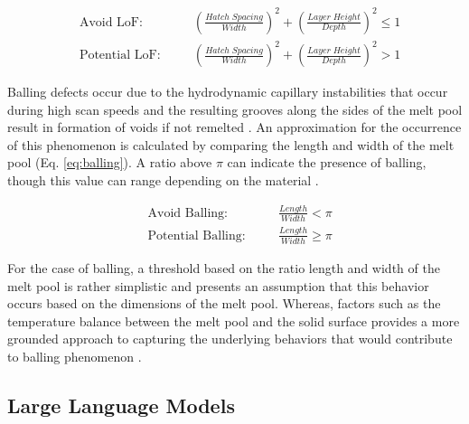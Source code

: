 \begin{subequations}
\label{eq:lof}
\begin{alignat}{2}
  &\text{Avoid LoF:} \quad && \left(\frac{Hatch\;Spacing}{Width}\right)^2 + \left(\frac{Layer\;Height}{Depth}\right)^2 \le 1 \label{eq:avoid_lack_of_fusion}\\
  &\text{Potential LoF:}    \quad && \left(\frac{Hatch\;Spacing}{Width}\right)^2 + \left(\frac{Layer\;Height}{Depth}\right)^2 > 1 \label{eq:potential_lack_of_fusion} 
\end{alignat}
\end{subequations}

Balling defects occur due to the hydrodynamic capillary instabilities that occur
during high scan speeds and the resulting grooves along the sides of the melt
pool result in formation of voids if not remelted \cite{gu_balling_2007}. An
approximation for the occurrence of this phenomenon is calculated by comparing
the length and width of the melt pool (Eq. \ref{eq:balling}). A ratio above
$\pi$ can indicate the presence of balling, though this value can range
depending on the material \cite{zhang_efficient_2021}.

\begin{subequations}
\label{eq:balling}
\begin{alignat}{2}
  &\text{Avoid Balling:}      \quad && \frac{Length}{Width} < \pi   \label{eq:avoid_balling}\\
  &\text{Potential Balling:}  \quad && \frac{Length}{Width} \ge \pi \label{eq:potential_balling}
\end{alignat}
\end{subequations}

For the case of balling, a threshold based on the ratio length and width of the
melt pool is rather simplistic and presents an assumption that this behavior
occurs based on the dimensions of the melt pool. Whereas, factors such as the
temperature balance between the melt pool and the solid surface provides a more
grounded approach to capturing the underlying behaviors that would contribute to
balling phenomenon \cite{lindstrom_simple_2023}. 

\subsection{Large Language Models}

